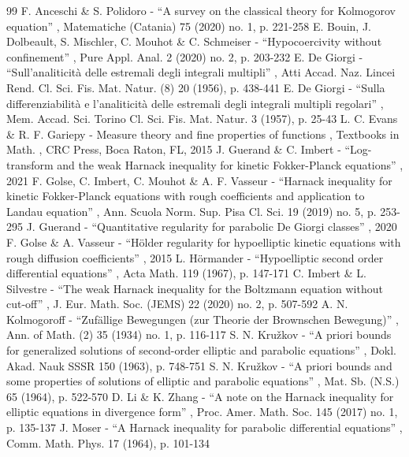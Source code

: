 \documentclass[11pt]{article}
\numberwithin{equation}{section}\let\oldbigcup\bigcup
\theoremstyle{definition}
\theoremstyle{remark}
\begin{document}

\begin{thebibliography}{99}
 F. Anceschi \& S. Polidoro - “A survey on the classical theory for Kolmogorov equation” , Matematiche (Catania) 75 (2020) no. 1, p. 221-258
 E. Bouin, J. Dolbeault, S. Mischler, C. Mouhot \& C. Schmeiser - “Hypocoercivity without confinement” , Pure Appl. Anal. 2 (2020) no. 2, p. 203-232
 E. De Giorgi - “Sull’analiticità delle estremali degli integrali multipli” , Atti Accad. Naz. Lincei Rend. Cl. Sci. Fis. Mat. Natur. (8) 20 (1956), p. 438-441
 E. De Giorgi - “Sulla differenziabilità e l’analiticità delle estremali degli integrali multipli regolari” , Mem. Accad. Sci. Torino Cl. Sci. Fis. Mat. Natur. 3 (1957), p. 25-43
 L. C. Evans \& R. F. Gariepy - Measure theory and fine properties of functions , Textbooks in Math. , CRC Press, Boca Raton, FL, 2015
 J. Guerand \& C. Imbert - “Log-transform and the weak Harnack inequality for kinetic Fokker-Planck equations” , 2021
 F. Golse, C. Imbert, C. Mouhot \& A. F. Vasseur - “Harnack inequality for kinetic Fokker-Planck equations with rough coefficients and application to Landau equation” , Ann. Scuola Norm. Sup. Pisa Cl. Sci. 19 (2019) no. 5, p. 253-295
 J. Guerand - “Quantitative regularity for parabolic De Giorgi classes” , 2020
 F. Golse \& A. Vasseur - “Hölder regularity for hypoelliptic kinetic equations with rough diffusion coefficients” , 2015
 L. Hörmander - “Hypoelliptic second order differential equations” , Acta Math. 119 (1967), p. 147-171
 C. Imbert \& L. Silvestre - “The weak Harnack inequality for the Boltzmann equation without cut-off” , J. Eur. Math. Soc. (JEMS) 22 (2020) no. 2, p. 507-592
 A. N. Kolmogoroff - “Zufällige Bewegungen (zur Theorie der Brownschen Bewegung)” , Ann. of Math. (2) 35 (1934) no. 1, p. 116-117
 S. N. Kružkov - “A priori bounds for generalized solutions of second-order elliptic and parabolic equations” , Dokl. Akad. Nauk SSSR 150 (1963), p. 748-751
 S. N. Kružkov - “A priori bounds and some properties of solutions of elliptic and parabolic equations” , Mat. Sb. (N.S.) 65 (1964), p. 522-570
 D. Li \& K. Zhang - “A note on the Harnack inequality for elliptic equations in divergence form” , Proc. Amer. Math. Soc. 145 (2017) no. 1, p. 135-137
 J. Moser - “A Harnack inequality for parabolic differential equations” , Comm. Math. Phys. 17 (1964), p. 101-134

\end{thebibliography}
\end{document}
